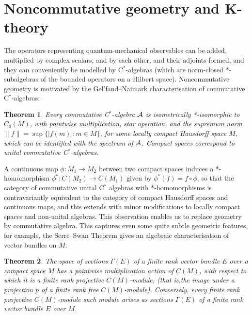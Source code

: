 \documentclass[11pt]{article}
\newcommand{\alg}{{\cal A}}
\newtheorem{theorem}{Theorem}
\begin{document}

\appendix

%
%

\section{Noncommutative geometry and K-theory}


The operators representing quantum-mechanical observables can be added,  multiplied by complex scalars, and by each other, and their adjoints formed, and they can conveniently be modelled by C$^*$-algebras (which are norm-closed *-subalgebras of the bounded operators on a Hilbert space).
Noncommutative geometry is motivated by the Gel'fand--Naimark characterisation of commutative C$^*$-algebras: 

\begin{theorem} 
Every commutative C$^*$-algebra $\alg$ is isometrically *-isomorphic to $C_0(M)$, with pointwise  multiplication, star operation, and the supremum norm $\|f\| = \sup\{ |f(m)|: m\in M\}$, for some locally compact Hausdorff space $M$, which can be identified with the spectrum of $\alg$. Compact spaces correspond to unital commutative C$^*$-algebras.
\end{theorem}


A continuous map  $\phi: M_1 \to M_2$ between two compact spaces induces a  *-homomorphism $\phi^*:C(M_2) \to C(M_1)$ given by $\phi^*(f) = f\circ\phi$, so that the category of commutative unital C$^*$ algebras with  *-homomorphisms is contravariantly equivalent to the category of compact Hausdorff spaces and continuous maps, and this extends with minor modifications to locally compact spaces and non-unital algebras. This observation enables us to replace geometry by commutative algebra. 
This captures even some quite subtle geometric features, for example, the Serre--Swan Theorem gives an algebraic characterisation of vector bundles on $M$:

\begin{theorem}
The space of sections $\Gamma(E)$ of a finite rank vector bundle $E$ over a compact space $M$ has a pointwise multiplication action of $C(M)$,  with respect to which it is a finite rank projective $C(M)$-module, (that is,the image under a projection $p$ of a finite rank free $C(M)$-module). Conversely,  every finite rank projective $C(M)$-module such module arises as sections $\Gamma(E)$ of a finite rank vector bundle $E$ over $M$.  
\end{theorem}
\end{document}
